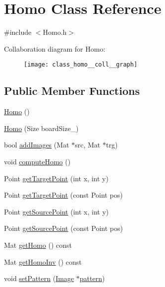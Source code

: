 \hypertarget{class_homo}{\section{Homo Class Reference}
\label{class_homo}
}


{\ttfamily \#include $<$Homo.\-h$>$}



Collaboration diagram for Homo\-:\nopagebreak
\begin{figure}[H]
\begin{center}
\leavevmode
\texttt{[image: class\_homo\_\_coll\_\_graph]}
\end{center}
\end{figure}
\subsection*{Public Member Functions}
\begin{DoxyCompactItemize}
\item 
\hyperlink{class_homo_ad900be60d091d959b64d49f4490e5c70}{Homo} ()
\item 
\hyperlink{class_homo_a76176c64001e0a7f3c51878ea0e343cc}{Homo} (Size board\-Size\-\_\-)
\item 
bool \hyperlink{class_homo_a5412617c15ec4b68ab31c109d1b2d6b2}{add\-Images} (Mat $\ast$src, Mat $\ast$trg)
\item 
void \hyperlink{class_homo_a65119d961a8cc3541699178fc664107a}{compute\-Homo} ()
\item 
Point \hyperlink{class_homo_af8f500747fd887d4692b77acba76c6ca}{get\-Target\-Point} (int x, int y)
\item 
Point \hyperlink{class_homo_a18f0551bcd55d63537ece501359cd446}{get\-Target\-Point} (const Point pos)
\item 
Point \hyperlink{class_homo_a10f5de8c9a2aa431c6163f827e9e8afc}{get\-Source\-Point} (int x, int y)
\item 
Point \hyperlink{class_homo_a5114c847e911ee46fe8fe6f756801552}{get\-Source\-Point} (const Point pos)
\item 
Mat \hyperlink{class_homo_ac613f239b006de5c5e858946ff662438}{get\-Homo} () const 
\item 
Mat \hyperlink{class_homo_af26f925be5708e0c22aaccd9d9ecadd4}{get\-Homo\-Inv} () const 
\item 
void \hyperlink{class_homo_aaf9f8de23b9cd624c4f9ac49df6155fc}{set\-Pattern} (\hyperlink{class_image}{Image} $\ast$\hyperlink{homography_2main_8cpp_aa64c85b483c7d8ad894f881e664ade9a}{pattern})
\end{DoxyCompactItemize}


